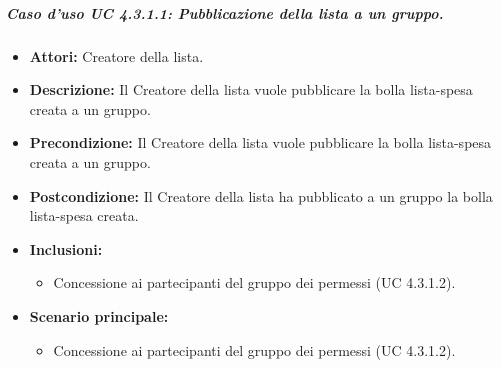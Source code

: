 \subparagraph{Caso d'uso UC 4.3.1.1: Pubblicazione della lista a un gruppo.}
\label{Caso d'uso UC 4.3.1.1: Pubblicazione della lista a un gruppo.}

\FloatBarrier
\begin{itemize}
\item \textbf{Attori:} Creatore della lista.
\item \textbf{Descrizione:} Il Creatore della lista vuole pubblicare la bolla lista-spesa creata a un gruppo.
\item \textbf{Precondizione:} Il Creatore della lista vuole pubblicare la bolla lista-spesa creata a un gruppo. 
\item \textbf{Postcondizione:} Il Creatore della lista ha pubblicato a un gruppo la bolla lista-spesa creata.
\item \textbf{Inclusioni:}
	\begin{itemize}
	\item{Concessione ai partecipanti del gruppo dei permessi (UC 4.3.1.2).}
	\end{itemize}
\item \textbf{Scenario principale:}
	\begin{itemize}
	\item{Concessione ai partecipanti del gruppo dei permessi (UC 4.3.1.2).}
	\end{itemize}
\end{itemize}